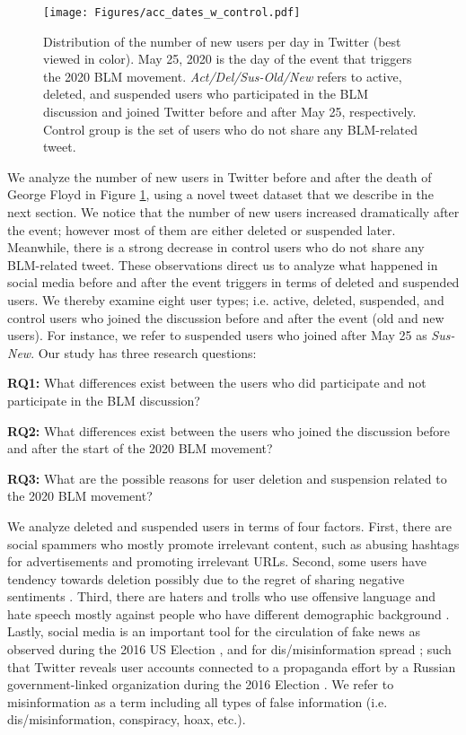 \documentclass[sigconf]{acmart}
\begin{document}
\begin{figure}[t]
\centering
\texttt{[image: Figures/acc\_dates\_w\_control.pdf]} 
\caption{Distribution of the number of new users per day in Twitter (best viewed in color). May 25, 2020 is the day of the event that triggers the 2020 BLM movement. \emph{Act/Del/Sus-Old/New} refers to active, deleted, and suspended users who participated in the BLM discussion and joined Twitter before and after May 25, respectively. Control group is the set of users who do not share any BLM-related tweet.}
\label{fig:acc_dates}
\end{figure}

We analyze the number of new users in Twitter before and after the death of George Floyd in Figure \ref{fig:acc_dates}, using a novel tweet dataset that we describe in the next section. We notice that the number of new users increased dramatically after the event; however most of them are either deleted or suspended later. Meanwhile, there is a strong decrease in control users who do not share any BLM-related tweet. These observations direct us to analyze what happened in social media before and after the event triggers in terms of deleted and suspended users. We thereby examine eight user types; i.e. active, deleted, suspended, and control users who joined the discussion before and after the event (old and new users).
For instance, we refer to suspended users who joined after May 25 as \emph{Sus-New}. Our study has three research questions: 

\textbf{RQ1:} What differences exist between the users who did participate and not participate in the BLM discussion? 

\textbf{RQ2:} What differences exist between the users who joined the discussion before and after the start of the 2020 BLM movement? 

\textbf{RQ3:} What are the possible reasons for user deletion and suspension related to the 2020 BLM movement? 


We analyze deleted and suspended users in terms of four factors. 
First, there are social spammers \cite{Lee:2010} who mostly promote irrelevant content, such as abusing hashtags for advertisements and promoting irrelevant URLs. Second, some users have tendency towards deletion possibly due to the regret of sharing negative sentiments \cite{Sleeper:2013}. Third, there are haters and trolls who use offensive language and hate speech mostly against people who have different demographic background \cite{Basile:2019,Silva:2016}. Lastly, social media is an important tool for the circulation of fake news as observed during the 2016 US Election \cite{Fourney:2017}, and for dis/misinformation spread \cite{Wu:2019}; such that Twitter reveals user accounts connected to a propaganda effort by a Russian government-linked organization during the 2016 Election \cite{Twitter:2019}. We refer to misinformation as a term including all types of false information (i.e. dis/misinformation, conspiracy, hoax, etc.). 
\end{document}

